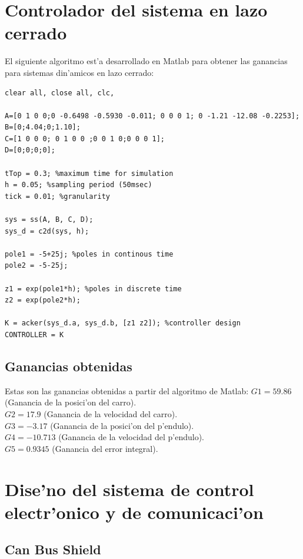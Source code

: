 \section{Controlador del sistema en lazo cerrado}
El siguiente algoritmo est'a desarrollado en Matlab para obtener las ganancias para sistemas din'amicos en lazo cerrado:
{\tiny
\lstset{language=Matlab, breaklines=true, basicstyle=\footnotesize}
\begin{lstlisting}[frame=single]
%% 1. STATE FEEDBACK DISCRETE TIME CONTROLLER
clear all, close all, clc,

A=[0 1 0 0;0 -0.6498 -0.5930 -0.011; 0 0 0 1; 0 -1.21 -12.08 -0.2253];
B=[0;4.04;0;1.10];
C=[1 0 0 0; 0 1 0 0 ;0 0 1 0;0 0 0 1];
D=[0;0;0;0];

tTop = 0.3; %maximum time for simulation
h = 0.05; %sampling period (50msec)
tick = 0.01; %granularity

sys = ss(A, B, C, D);
sys_d = c2d(sys, h);

pole1 = -5+25j; %poles in continous time
pole2 = -5-25j;

z1 = exp(pole1*h); %poles in discrete time
z2 = exp(pole2*h);

K = acker(sys_d.a, sys_d.b, [z1 z2]); %controller design
CONTROLLER = K
\end{lstlisting}
}
\subsection{Ganancias obtenidas}
Estas son las ganancias obtenidas a partir del algoritmo de Matlab:
$G1=59.86$ (Ganancia de la posici'on del carro).\\
$G2=17.9$ (Ganancia de la velocidad del carro).\\
$G3=-3.17$ (Ganancia de la posici'on del p'endulo).\\
$G4=-10.713$ (Ganancia de la velocidad del p'endulo).\\
$G5=0.9345$ (Ganancia del error integral).

\section{Dise'no del sistema de control electr'onico y de comunicaci'on}

\subsection{Can Bus Shield}

